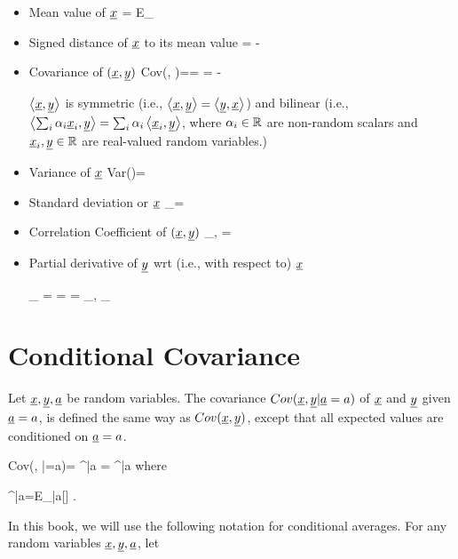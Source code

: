 \begin{itemize}
\item
Mean value of $\rvx$
\beq
\av{\rvx}=
E_\rvx[\rvx]
\eeq

\item
Signed distance of $\rvx$ to its mean value
\beq
\Delta \rvx = \rvx - \av{\rvx}
\eeq

\item
Covariance of $(\rvx, \rvy)$
\beq
Cov(\rvx, \rvy)=\av{\rvx, \rvy}=
\av{\Delta \rvx \Delta \rvy}
=
\av{\rvx\rvy}-\av{\rvx}\av{\rvy}
\eeq

$\av{\rvx, \rvy}$ is symmetric
(i.e., $\av{\rvx, \rvy}=\av{\rvy, \rvx}$)
and bilinear (i.e.,
$\av{\sum_i \alp_i\rvx_i, \rvy}
=
\sum_i\alp_i\av{\rvx_i, \rvy}$, where
$\alpha_i\in { \mathbb{R}}$
are non-random scalars
and $\rvx_i, \rvy\in\RR$ are
real-valued random
variables.)

\item
Variance of $\rvx$
\beq
Var(\rvx)=\av{\rvx, \rvx}
\eeq

\item
Standard deviation or $\rvx$
\beq
\sigma_\rvx=\sqrt{\av{\rvx, \rvx}}
\eeq

\item
Correlation Coefficient of $(\rvx, \rvy)$
\beq
\rho_{\rvx, \rvy}=
\frac{\av{\rvx, \rvy}}
{\sqrt{\av{\rvx, \rvx}\av{\rvy, \rvy}}}
\eeq

\item Partial derivative of $\rvy$
wrt (i.e., with respect to) $\rvx$

\beq
\partial_\rvx\rvy
=
\pder{\rvy}{\rvx}
=
\frac{\av{\rvx,\rvy}}
{\av{\rvx, \rvx}}
=
\rho_{\rvx, \rvy}\frac{
\s_\rvy}
{\s_\rvx}
\eeq
\end{itemize}


\section{Conditional Covariance}
\label{sec-cond-cov}
Let $\rvx, \rvy, \rva$
be random variables.
The covariance $Cov(\rvx, \rvy|\rva=a)$
of $\rvx$ and $\rvy$
given $\rva=a$, is defined
the same
way as $Cov(\rvx, \rvy)$,
except that all
expected values are
conditioned on $\rva=a$.



\beq
Cov(\rvx, \rvy|\rva=a)=
\av{\rvx, \rvy}^{|a}
=
^{|a}
\eeq
where

\beq
\av{\rvx}^{|a}=E_{\rvx|a}[\rvx]
\;.
\eeq

In this book, we will use the following notation
for conditional averages.
For any random
variables $\rvx, \rvy, \rva$, let

